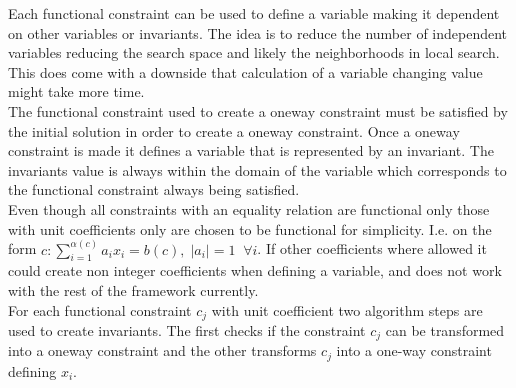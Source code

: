 Each functional constraint can be used to define a variable making it dependent on other variables or invariants. The 
idea is to reduce the number of independent variables reducing the search space and likely the neighborhoods in local 
search. This does come with a downside that calculation of a variable changing value might take more time. \\ 
The functional constraint used to create a oneway constraint must be satisfied by the initial solution in order to 
create a oneway constraint. Once a oneway constraint is made it defines a variable that is represented by an invariant. 
The invariants value is always within the domain of the variable which corresponds to the functional constraint always 
being satisfied. \\
Even though all  constraints with an equality relation are functional only those with unit 
coefficients only are chosen to be functional for simplicity. I.e. on the form $c: \sum\limits_{i=1}^{\alpha(c)} a_i 
x_i = b(c), \; |a_i|= 1 \; \; \forall i $. If other coefficients where allowed it could create non integer coefficients 
when defining a variable, and does not work with the rest of the framework currently. \\ 
For each functional  constraint $c_j$ with unit coefficient two algorithm steps are used to create 
invariants. The first checks if the constraint $c_j$ can be transformed into a oneway constraint and the other 
transforms $c_j$ into a one-way constraint defining $x_i$. \\ 
\IncMargin{1em}
